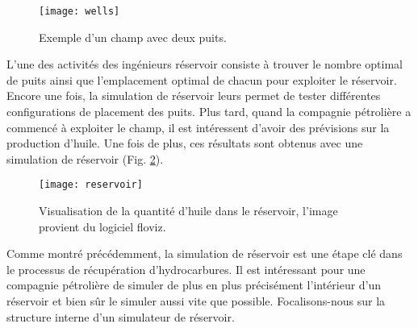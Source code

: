 \begin{figure}[!ht]
  \centering
  \texttt{[image: wells]}
  \caption{Exemple d'un champ avec deux puits.}
\label{fig:wells}
\end{figure}


L'une des activités des ingénieurs réservoir consiste à trouver le nombre optimal de puits ainsi que l'emplacement optimal de chacun pour exploiter le réservoir.
%
Encore une fois, la simulation de réservoir leurs permet de tester différentes configurations de placement des puits.
%
Plus tard, quand la compagnie pétrolière a commencé à exploiter le champ, il est intéressent d'avoir des prévisions sur la production d'huile.
%
Une fois de plus, ces résultats sont obtenus avec une simulation de réservoir (Fig. \ref{fig:floviz}).

\begin{figure}[!ht]
  \centering
  \texttt{[image: reservoir]}
  \caption{Visualisation de la quantité d'huile dans le réservoir, l'image provient du logiciel floviz.}
\label{fig:floviz}
\end{figure}

Comme montré précédemment, la simulation de réservoir est une étape clé dans le processus de récupération d'hydrocarbures.
%
Il est intéressant pour une compagnie pétrolière de simuler de plus en plus précisément l'intérieur d'un réservoir et bien sûr le simuler aussi vite que possible.
%
Focalisons-nous sur la structure interne d'un simulateur de réservoir.
